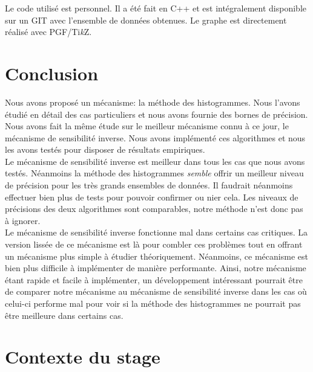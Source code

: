 Le code utilisé est personnel. Il a été fait en C++ et est intégralement disponible sur un GIT \cite{git} avec l'ensemble de données obtenues. Le graphe est directement réalisé avec PGF/Ti\textit{k}Z. 

\section*{Conclusion}

Nous avons proposé un mécanisme: la méthode des histogrammes. Nous l'avons étudié en détail des cas particuliers et nous avons fournie des bornes de précision. Nous avons fait la même étude sur le meilleur mécanisme connu à ce jour, le mécanisme de sensibilité inverse. Nous avons implémenté ces algorithmes et nous les avons testés pour disposer de résultats empiriques.\\

Le mécanisme de sensibilité inverse est meilleur dans tous les cas que nous avons testés. Néanmoins la méthode des histogrammes \textit{semble} offrir un meilleur niveau de précision pour les très grands ensembles de données. Il faudrait néanmoins effectuer bien plus de tests pour pouvoir confirmer ou nier cela. Les niveaux de précisions des deux algorithmes sont comparables, notre méthode n'est donc pas à ignorer.\\

Le mécanisme de sensibilité inverse fonctionne mal dans certains cas critiques. La version lissée de ce mécanisme est là pour combler ces problèmes tout en offrant un mécanisme plus simple à étudier théoriquement. Néanmoins, ce mécanisme est bien plus difficile à implémenter de manière performante. Ainsi, notre mécanisme étant rapide et facile à implémenter, un développement intéressant pourrait être de comparer notre mécanisme au mécanisme de sensibilité inverse dans les cas où celui-ci performe mal pour voir si la méthode des histogrammes ne pourrait pas être meilleure dans certains cas.
 
\newpage
{}
\printbibliography[heading=bibintoc] 





\clearpage
\appendix

\section{Contexte du stage}

